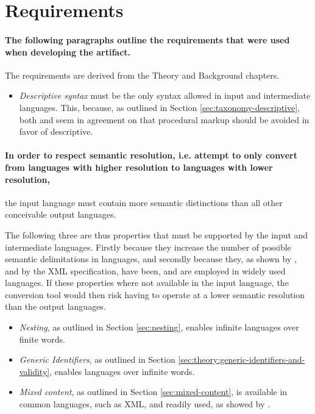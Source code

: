 \documentclass{scrreprt}
\begin{document}
\section{Requirements}
\label{sec:empirical-requirements}
\paragraph{The following paragraphs outline the requirements that were used when developing the artifact.} The requirements are derived from the Theory and Background chapters.

\begin{itemize}
\item \emph{Descriptive syntax} must be the only syntax allowed in input and intermediate languages. This, because, as outlined in Section \ref{sec:taxonomy-descriptive}, both \citet{coombs} and \citet{bray} seem in agreement on that procedural markup should be avoided in favor of descriptive.
\end{itemize}


\paragraph{In order to respect semantic resolution, i.e. attempt to only convert from languages with higher resolution to languages with lower resolution,} the input language must contain more semantic distinctions than all other conceivable output languages.

The following three are thus properties that must be supported by the input and intermediate languages. Firstly because they increase the number of possible semantic delimitations in languages, and secondly because they, as shown by \citet{coombs}, and by the XML specification, have been, and are employed in widely used languages. If these properties where not available in the input language, the conversion tool would then risk having to operate at a lower semantic resolution than the output languages.

\begin{itemize}
\item \emph{Nesting}, as outlined in Section \ref{sec:nesting}, enables infinite languages over finite words.
\item \emph{Generic Identifiers}, as outlined in Section \ref{sec:theory:generic-identifiers-and-validity}, enables languages over infinite words.
\item \emph{Mixed content}, as outlined in Section \ref{sec:mixed-content}, is available in common languages, such as XML, and readily used, as showed by \citet{mignet}.
\end{itemize}
\end{document}
